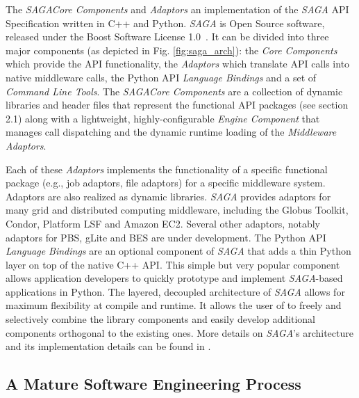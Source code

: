 \documentclass[a4paper,10pt]{article}
\newcommand{\I}[1]{\textit{#1}}
\newcommand{\sagaspec}{\textit{SAGA}\xspace}
\newcommand{\sagaimpl}{\textit{SAGA}\xspace}
\newcommand{\spec}{\sagaspec}
\newcommand{\impl}{\sagaimpl}
\begin{document}
The \impl \I{Core Components} and \I{Adaptors} an implementation
of the \spec API Specification written in C++ and Python. \impl is
Open Source software, released under the Boost Software
License 1.0~\cite{boost_license_web}. It can be divided into
three major components (as depicted in Fig. \ref{fig:saga_arch}):
the \I{Core Components} which provide the API functionality, the
\I{Adaptors} which translate API calls into native middleware calls,
the Python API \I{Language Bindings} and a set of \I{Command Line
  Tools}. The \impl \I{Core Components} are a collection of dynamic
libraries and header files that represent the functional API packages
(see section 2.1) along with a lightweight, highly-configurable
\I{Engine Component} that manages call dispatching and the dynamic
runtime loading of the \I{Middleware Adaptors}.


Each of these \I{Adaptors} implements the functionality of a specific
functional package (e.g., job adaptors, file adaptors) for a specific
middleware system. Adaptors are also realized as dynamic
libraries. \impl provides adaptors for many grid and distributed
computing middleware, including the Globus Toolkit, Condor, Platform
LSF and Amazon EC2. Several other adaptors, notably adaptors for PBS,
gLite and BES are under development. The Python API \I{Language
  Bindings} are an optional component of \impl that adds a thin Python
layer on top of the native C++ API. This simple but very popular
component allows application developers to quickly prototype and
implement \impl-based applications in Python.  The layered, decoupled
architecture of \impl allows for maximum flexibility at compile and
runtime. It allows the user of to freely and selectively combine the
library components and easily develop additional components orthogonal
to the existing ones. More details on \impl's architecture and its
implementation details can be found in \cite{OOPSLA_PAPER}.



\subsection*{A Mature Software Engineering Process\label{engineering}}
\end{document}
